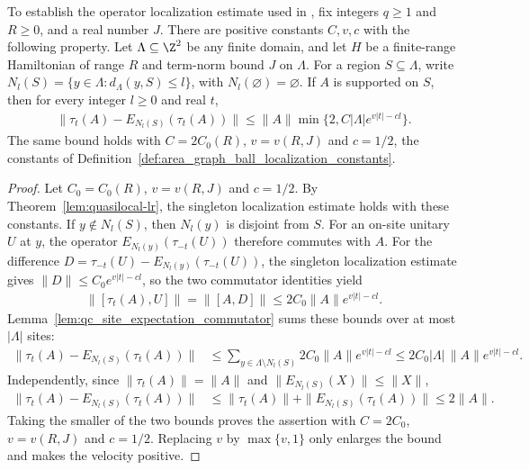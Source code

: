 \begin{lemma}
    \label{thm:area_region_localization}
    \leanok
    To establish the operator localization estimate used in
    \cite{OpenAI2026PolynomialPEPS}, fix integers $q\geq1$ and $R\geq0$,
    and a real number $J$.
    There are positive constants $C,v,c$ with the following property.
    Let $\Lambda\subseteq\Z^2$ be any finite domain, and let $H$ be a
    finite-range Hamiltonian of range $R$ and term-norm bound $J$ on
    $\Lambda$. For a region $S\subseteq\Lambda$, write
    $N_l(S)=\{y\in\Lambda:d_\Lambda(y,S)\leq l\}$, with
    $N_l(\varnothing)=\varnothing$. If $A$ is supported on $S$, then for
    every integer $l\geq0$ and real $t$,
    \begin{align*}
        \|\tau_t(A)-E_{N_l(S)}(\tau_t(A))\|
        \leq\|A\|\min\{2,C|\Lambda|e^{v|t|-cl}\}.
    \end{align*}
    The same bound holds with $C=2C_0(R)$, $v=v(R,J)$ and $c=1/2$, the
    constants of Definition~\ref{def:area_graph_ball_localization_constants}.
\end{lemma}
\begin{proof}\leanok
    Let $C_0=C_0(R)$, $v=v(R,J)$ and $c=1/2$. By
    Theorem~\ref{lem:quasilocal-lr}, the singleton localization estimate holds
    with these constants.
    If $y\notin N_l(S)$, then $N_l(y)$ is disjoint from $S$.
    For an on-site unitary $U$ at $y$, the operator
    $E_{N_l(y)}(\tau_{-t}(U))$ therefore commutes with $A$. For the
    difference $D=\tau_{-t}(U)-E_{N_l(y)}(\tau_{-t}(U))$, the singleton
    localization estimate gives $\|D\|\leq C_0e^{v|t|-cl}$, so the two
    commutator identities yield
    \begin{align*}
        \|[\tau_t(A),U]\|=\|[A,D]\|
        \leq2C_0\|A\|e^{v|t|-cl}.
    \end{align*}
    Lemma~\ref{lem:qc_site_expectation_commutator} sums these bounds over
    at most $|\Lambda|$ sites:
    \begin{align*}
        \|\tau_t(A)-E_{N_l(S)}(\tau_t(A))\|
         & \leq\sum_{y\in\Lambda\setminus N_l(S)}2C_0\|A\|e^{v|t|-cl}
        \leq2C_0|\Lambda|\,\|A\|e^{v|t|-cl}.
    \end{align*}
    Independently, since $\|\tau_t(A)\|=\|A\|$ and
    $\|E_{N_l(S)}(X)\|\leq\|X\|$,
    \begin{align*}
        \|\tau_t(A)-E_{N_l(S)}(\tau_t(A))\|
         & \leq\|\tau_t(A)\|+\|E_{N_l(S)}(\tau_t(A))\|
        \leq2\|A\|.
    \end{align*}
    Taking the smaller of the two bounds proves the assertion with
    $C=2C_0$, $v=v(R,J)$ and $c=1/2$. Replacing $v$ by $\max\{v,1\}$ only
    enlarges the bound and makes the velocity positive.
\end{proof}
